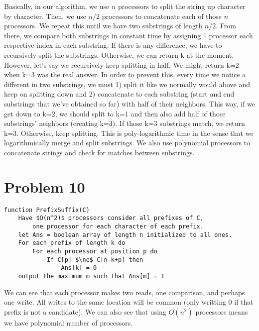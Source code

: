 \documentclass{article}
\providecommand{\prob}[1]{\section*{Problem #1}}
\begin{document}
Basically, in our algorithm, we use $n$ processors to split the string up character by character.  Then, we use $n/2$ processors to concatenate each of those $n$ processors.  We repeat this until we have two substrings of length $n/2$.  From there, we compare both substrings in constant time by assigning 1 processor each respective index in each substring.  If there is any difference, we have to recursively split the substrings.  Otherwise, we can return k at the moment.  However, let's say we recursively keep splitting in half.  We might return k=2 when k=3 was the real answer.  In order to prevent this, every time we notice a different in two substrings, we must 1) split it like we normally would above and keep on splitting down and 2) concatenate to each substring (start and end substrings that we've obtained so far) with half of their neighbors.  This way, if we get down to k=2, we should split to k=1 and then also add half of those substrings' neighbors (creating k=3).  If those k=3 substrings match, we return k=3.  Otherwise, keep splitting.  This is poly-logarithmic time in the sense that we logarithmically merge and split substrings.  We also use polynomial processors to concatenate strings and check for matches between substrings.

\prob{10}

\begin{lstlisting}
function PrefixSuffix(C)
    Have $O(n^2)$ processors consider all prefixes of C,
        one processor for each character of each prefix.
    let Ans = boolean array of length n initialized to all ones.
    For each prefix of length k do
        For each processor at position p do
            If C[p] $\ne$ C[n-k+p] then
                Ans[k] = 0
    output the maximum m such that Ans[m] = 1
\end{lstlisting}

We can see that each processor makes two reads, one comparison, and perhaps one write.
All writes to the same location will be common (only writting 0 if that prefix is not a candidate).
We can also see that using $O(n^2)$ processors means we have polynomial number of processors.
\end{document}
